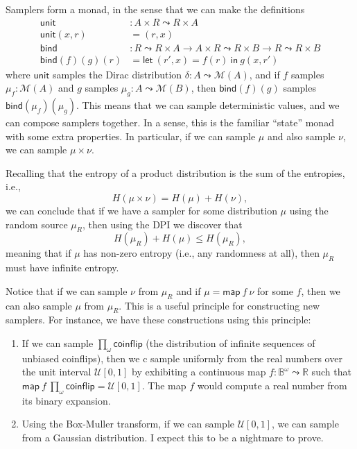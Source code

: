 \documentclass{article}           %
\newcommand{\R}{\mathbb{R}}
\newcommand{\map}[2]{\mathsf{map}\ {#1}\ {#2}}
\newcommand{\Dist}[1]{\mathcal{M}({#1})}
\newcommand{\coinflip}{\mathsf{coinflip}}
\newcommand{\bool}{\mathbb{B}}
\begin{document}
Samplers form a monad, in the sense that we can make the definitions
\begin{align*}
\mathsf{unit} &: A \times R \leadsto R \times A
\\ \mathsf{unit}(x, r) &= (r, x)
\\ \mathsf{bind} &: R \leadsto R \times A \to A \times R \leadsto R \times B
  \to R \leadsto R \times B
\\ \mathsf{bind}(f)(g)(r) &= \mathsf{let}\ (r', x) = f(r)\ \mathsf{in}\ g(x, r')
\end{align*}
where $\mathsf{unit}$ samples the Dirac distribution $\delta : A \leadsto \Dist{A}$,
and if $f$ samples $\mu_f : \Dist{A}$ and $g$ samples $\mu_g : A \leadsto \Dist{B}$, then $\mathsf{bind}(f)(g)$ samples $\mathsf{bind}(\mu_f)(\mu_g)$. This means that we can sample deterministic values, and we can compose samplers together. In a sense, this is the familiar ``state'' monad with some extra properties. In particular, if we can sample $\mu$ and also sample $\nu$, we can sample $\mu \times \nu$.

Recalling that the entropy of a product distribution is the sum of the entropies, i.e.,
\[
H(\mu \times \nu) = H(\mu) + H(\nu),
\]
we can conclude that if we have a sampler for some distribution $\mu$ using the random source $\mu_R$, then using the DPI we discover that
\[
H(\mu_R) + H(\mu) \le H(\mu_R),
\]
meaning that if $\mu$ has non-zero entropy (i.e., any randomness at all), then $\mu_R$ must have infinite entropy.

Notice that if we can sample $\nu$ from $\mu_R$ and if $\mu = \map{f}{\nu}$ for some $f$, then we can also sample $\mu$ from $\mu_R$. This is a useful principle for constructing new samplers. For instance, we have these constructions using this principle:
\begin{enumerate}
\item If we can sample $\prod_\omega \coinflip$ (the distribution of infinite sequences of unbiased coinflips), then we c sample uniformly from the real numbers over the unit interval $\mathcal{U}[0,1]$ by exhibiting a continuous map $f : \bool^\omega \leadsto \R$ such that $\map{f}{\prod_\omega \coinflip} = \mathcal{U}[0,1]$. The map $f$ would compute a real number from its binary expansion.
\item Using the Box-Muller transform, if we can sample $\mathcal{U}[0,1]$, we can sample from a Gaussian distribution. I expect this to be a nightmare to prove.
\end{enumerate}
\end{document}
